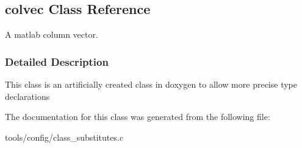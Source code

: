 \hypertarget{classcolvec}{}\subsection{colvec Class Reference}
\label{classcolvec}


A matlab column vector.  




\subsubsection{Detailed Description}
This class is an artificially created class in doxygen to allow more precise type declarations 

The documentation for this class was generated from the following file\+:\begin{DoxyCompactItemize}
\item 
tools/config/class\+\_\+substitutes.\+c\end{DoxyCompactItemize}
